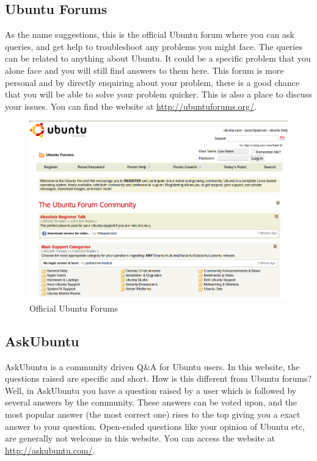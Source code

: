 \subsection*{Ubuntu Forums}  
As the name suggestions, this is the official Ubuntu forum where you can ask queries, and get help to troubleshoot any problems you might face. The queries can be related to anything about Ubuntu. It could be a specific problem that you alone face and you will still find answers to them here. This forum is more personal and by directly enquiring about your problem, there is a good chance that you will be able to solve your problem quicker. This is also a place to discuss your issues. You can find the website at \href{http://ubuntuforums.org/}{http://ubuntuforums.org/}.

\begin{figure}[h!]	
	\centering
	\includegraphics[width=350pt]{./images/get-help/ubuntuforums.png}
	\caption{Official Ubuntu Forums}	
	\label{fig:ubuntuforums}		
\end{figure}

\subsection*{AskUbuntu}
AskUbuntu is a community driven Q\&A for Ubuntu users. In this website, the questions raised are specific and short. How is this different from Ubuntu forums? Well, in AskUbuntu you have a question raised by a user which is followed by several answers by the community. These answers can be voted upon, and the most popular answer (the most correct one) rises to the top giving you a exact answer to your question. Open-ended questions like your opinion of Ubuntu etc, are generally not welcome in this website. You can access the website at \href{http://askubuntu.com/}{http://askubuntu.com/}.

